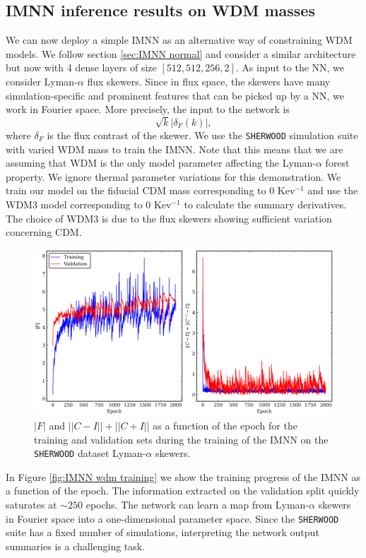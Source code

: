 \subsection{IMNN inference results on WDM masses}\label{sec:IMNN}
We can now deploy a simple IMNN as an alternative way of constraining WDM models. We follow section \ref{sec:IMNN normal} and consider a similar architecture but now with 4 dense layers of size $[512, 512, 256, 2]$. As input to the NN, we consider Lyman-$\alpha$ flux skewers. Since in flux space, the skewers have many simulation-specific and prominent features that can be picked up by a NN, we work in Fourier space. More precisely, the input to the network is 
\begin{equation}
    \sqrt{k} |\delta_F (k)|,
\end{equation}
where $\delta_F$ is the flux contrast of the skewer.
We use the \texttt{SHERWOOD} simulation suite with varied WDM mass to train the IMNN. Note that this means that we are assuming that WDM is the only model parameter affecting the Lyman-$\alpha$ forest property. We ignore thermal parameter variations for this demonstration. We train our model on the fiducial CDM mass corresponding to $0$ Kev$^{-1}$ and use the WDM3 model corresponding to $0$ Kev$^{-1}$ to calculate the summary derivatives. The choice of WDM3 is due to the flux skewers showing sufficient variation concerning CDM.

\begin{figure}
    \centering
    \includegraphics[width=0.95\linewidth]{img/ML/WDM_training_plot.png}
    \caption{$|F|$ and $||C-I ||+||C+I||$ as a function of the epoch for the training and validation sets during the training of the IMNN on the \texttt{SHERWOOD} dataset Lyman-$\alpha$ skewers.}
    \label{fig:IMNN  wdm training}
\end{figure}
In Figure \ref{fig:IMNN wdm training} we show the training progress of the IMNN as a function of the epoch. The information extracted on the validation split quickly saturates at $\sim 250$ epochs. The network can learn a map from Lyman-$\alpha$ skewers in Fourier space into a one-dimensional parameter space. Since the \texttt{SHERWOOD} suite has a fixed number of simulations, interpreting the network output summaries is a challenging task.


